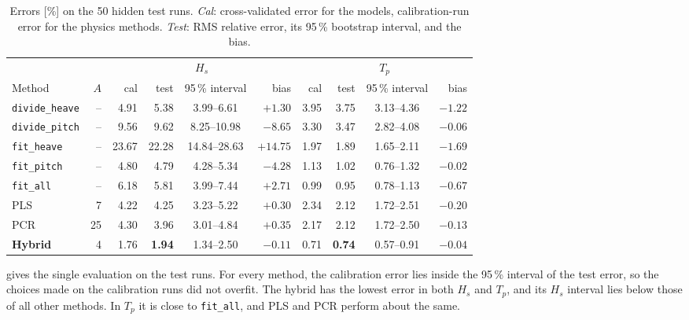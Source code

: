 \documentclass[10pt,a4paper,twocolumn,twoside]{article}
\newcommand{\Hs}{H_{s}}
\newcommand{\Tp}{T_{p}}
\begin{document}
\begin{table}[t]
  \centering
  \caption{Errors [\%] on the 50 hidden test runs. \emph{Cal}: cross-validated error for the
           models, calibration-run error for the physics methods. \emph{Test}: RMS relative
           error, its 95\,\% bootstrap interval, and the bias.}
  \label{tab:test}
  \small
  \setlength{\tabcolsep}{4pt}
  \begin{tabular}{@{}lrrrcrrrcr@{}}
    \toprule
    & & \multicolumn{4}{c}{$\Hs$} & \multicolumn{4}{c}{$\Tp$} \\
    \cmidrule(lr){3-6}\cmidrule(l){7-10}
    Method & $A$ & cal & test & 95\,\% interval & bias & cal & test & 95\,\% interval & bias \\
    \midrule
    \texttt{divide\_heave} & -- &  4.91 &  5.38 &  3.99--6.61  &  $+1.30$ & 3.95 & 3.75 & 3.13--4.36 & $-1.22$ \\
    \texttt{divide\_pitch} & -- &  9.56 &  9.62 &  8.25--10.98 &  $-8.65$ & 3.30 & 3.47 & 2.82--4.08 & $-0.06$ \\
    \texttt{fit\_heave}    & -- & 23.67 & 22.28 & 14.84--28.63 & $+14.75$ & 1.97 & 1.89 & 1.65--2.11 & $-1.69$ \\
    \texttt{fit\_pitch}    & -- &  4.80 &  4.79 &  4.28--5.34  &  $-4.28$ & 1.13 & 1.02 & 0.76--1.32 & $-0.02$ \\
    \texttt{fit\_all}      & -- &  6.18 &  5.81 &  3.99--7.44  &  $+2.71$ & 0.99 & 0.95 & 0.78--1.13 & $-0.67$ \\
    \midrule
    PLS                    &  7 &  4.22 &  4.25 &  3.23--5.22  &  $+0.30$ & 2.34 & 2.12 & 1.72--2.51 & $-0.20$ \\
    PCR                    & 25 &  4.30 &  3.96 &  3.01--4.84  &  $+0.35$ & 2.17 & 2.12 & 1.72--2.50 & $-0.13$ \\
    \textbf{Hybrid}        &  4 &  1.76 & \textbf{1.94} &  1.34--2.50 & $-0.11$ & 0.71 & \textbf{0.74} & 0.57--0.91 & $-0.04$ \\
    \bottomrule
  \end{tabular}
\end{table}

 gives the single evaluation on the test runs. For every method, the calibration
error lies inside the 95\,\% interval of the test error, so the choices made on the calibration
runs did not overfit. The hybrid has the lowest error in both $\Hs$ and $\Tp$, and its $\Hs$
interval lies below those of all other methods. In $\Tp$ it is close to \texttt{fit\_all}, and PLS
and PCR perform about the same.
\end{document}
